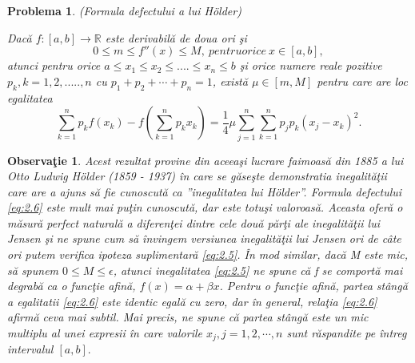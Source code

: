 \documentclass[a4paper,12pt,oneside]{report}
\newtheorem{problem}{Problema}
\newtheorem{remark}{Observa\c{t}ie}
\begin{document}
\begin{problem}
(Formula defectului a lui Hölder)

Dac\u{a} \(f : \left [ a,b  \right ] \to \mathbb{R}\) este derivabil\u{a} de doua ori \c{s}i
\begin{displaymath}
  0 \leq m \leq  f''\left ( x \right ) \leq  M,~ pentru orice ~x\in \left [ a,b \right ], \label{eq:2.5} \tag{2.5}
\end{displaymath}
atunci pentru orice  \(a\leq x_{1}\leq x_{2}\leq ....\leq x_{n} \leq b \) \c{s}i orice numere reale pozitive \(p_{k}, k= 1,2,.....,n \) cu \(p_{1} + p_{2} + \cdots+ p_{n} = 1\),  exist\u{a}  \(\mu \in \left [ m, M \right ]\) pentru care are loc egalitatea
\begin{displaymath}
  \sum_{k = 1}^{n}p_{k}f\left ( x_{k} \right ) - f\left ( \sum_{k = 1}^{n} p_{k}x_{k}\right ) = \frac{1}{4}\mu \sum_{j = 1}^{n}\sum_{k = 1}^{n}p_{j}p_{k}\left ( x_{j} - x_{k} \right )^{2}. \label{eq:2.6} \tag{2.6}
\end{displaymath}
\end{problem}
\begin{remark}
Acest rezultat provine din aceea\c{s}i lucrare faimoas\u{a} din 1885 a lui Otto Ludwig Hölder (1859 - 1937) \^{i}n care se g\u{a}seşte demonstratia inegalit\u{a}ţii care are a ajuns s\u{a} fie cunoscut\u{a}  ca ”inegalitatea lui Hölder”. Formula defectului \ref{eq:2.6} este mult mai pu\c{t}in cunoscut\u{a}, dar este totu\c{s}i valoroas\u{a}. Aceasta ofer\u{a} o m\u{a}sur\u{a} perfect natural\u{a} a diferen\c{t}ei dintre cele dou\u{a} p\u{a}r\c{t}i ale inegalit\u{a}\c{t}ii lui Jensen \c{s}i ne spune cum s\u{a} \^{i}nvingem versiunea  inegalit\u{a}\c{t}ii lui Jensen ori de c\^{a}te ori putem verifica ipoteza suplimentar\u{a} \ref{eq:2.5}.
\^{I}n mod similar, dac\u{a} M este mic, s\u{a} spunem \(0 \leq M \leq \epsilon\), atunci inegalitatea \ref{eq:2.5} ne spune c\u{a} f se comport\u{a} mai degrab\u{a} ca o func\c{t}ie afin\u{a}, \(f\left ( x \right ) = \alpha  + \beta x\). Pentru o func\c{t}ie afin\u{a}, partea st\^{a}ng\u{a} a egalitatii \ref{eq:2.6} este identic egal\u{a} cu zero, dar \^{i}n general, rela\c{t}ia \ref{eq:2.6} afirm\u{a} ceva mai subtil. Mai precis, ne spune c\u{a} partea st\^{a}ng\u{a} este un mic multiplu al unei expresii  \^{i}n care valorile \(x_{j}, j = 1,2,\cdots ,n \) sunt r\u{a}spandite pe \^{i}ntreg intervalul \(\left [ a, b \right ]. \)
\end{remark}
\end{document}
